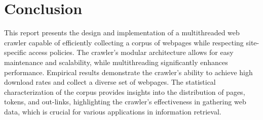 \documentclass[sigconf]{acmart}
\begin{document}
\section{Conclusion}
This report presents the design and implementation of a multithreaded web crawler capable of efficiently collecting a corpus of webpages while respecting site-specific access policies. The crawler's modular architecture allows for easy maintenance and scalability, while multithreading significantly enhances performance. Empirical results demonstrate the crawler's ability to achieve high download rates and collect a diverse set of webpages. The statistical characterization of the corpus provides insights into the distribution of pages, tokens, and out-links, highlighting the crawler's effectiveness in gathering web data, which is crucial for various applications in information retrieval.
\end{document}

